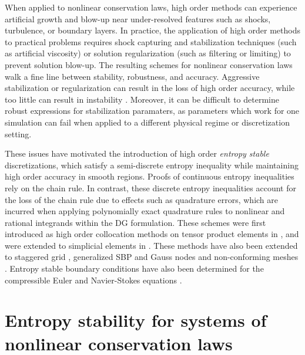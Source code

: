 \documentclass[review]{siamart0216}
\theoremstyle{assumption}
\newcommand{\note}[1]{{\color{blue}{#1}}}
\begin{document}
When applied to nonlinear conservation laws, high order methods can experience artificial growth and blow-up near under-resolved features such as shocks, turbulence, or boundary layers.  In practice, the application of high order methods to practical problems requires shock capturing and stabilization techniques (such as artificial viscosity) or solution regularization (such as filtering or limiting) to prevent solution blow-up.  The resulting schemes for nonlinear conservation laws walk a fine line between stability, robustness, and accuracy.  Aggressive stabilization or regularization can result in the loss of high order accuracy, while too little can result in instability \cite{wang2013high}.  Moreover, it can be difficult to determine robust expressions for stabilization paramaters, as parameters which work for one simulation can fail when applied to a different physical regime or discretization setting.  

These issues have motivated the introduction of high order \textit{entropy stable} discretizations, which satisfy a semi-discrete entropy inequality while maintaining high order accuracy in smooth regions.  Proofs of continuous entropy inequalities rely on the chain rule.  In contrast, these discrete entropy inequalities account for the loss of the chain rule due to effects such as quadrature errors, which are incurred when applying polynomially exact quadrature rules to nonlinear and rational integrands within the DG formulation.  These schemes were first introduced as high order collocation methods on tensor product elements in \cite{fisher2013high, carpenter2014entropy, gassner2016split, gassner2017br1}, and were extended to simplicial elements in \cite{crean2017high, chen2017entropy, crean2018entropy, chan2017discretely, chan2018discretely}.  These methods have also been extended to staggered grid \cite{parsani2016entropy}, generalized SBP and Gauss nodes \cite{chan2018efficient} and non-conforming meshes \cite{friedrich2017entropy}.  Entropy stable boundary conditions have also been determined for the compressible Euler and Navier-Stokes equations \cite{parsani2015entropy, svard2018entropy}.  

\note{Finish: add Section description.  Talk about situations where the SBP or decoupled SBP property doesn't hold: triangles with reduced surface quadrature, GLL quads with GQ face quadratures, and hybrid couplings.}

\section{Entropy stability for systems of nonlinear conservation laws}
\end{document}
